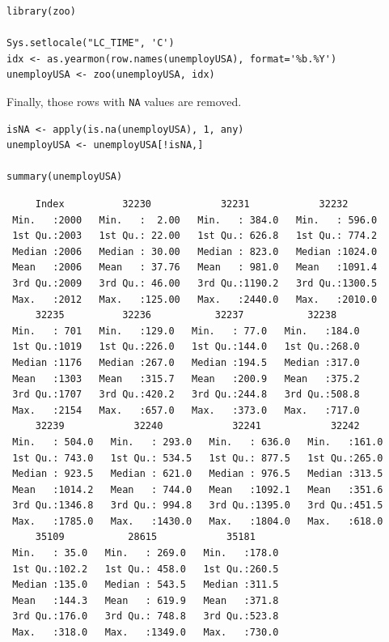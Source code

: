 \lstset{language=r,label= ,caption= ,captionpos=b,numbers=none}
\begin{lstlisting}
library(zoo)
  
Sys.setlocale("LC_TIME", 'C')
idx <- as.yearmon(row.names(unemployUSA), format='%b.%Y')
unemployUSA <- zoo(unemployUSA, idx)
\end{lstlisting}


Finally, those rows with \texttt{NA} values are removed.

\lstset{language=r,label= ,caption= ,captionpos=b,numbers=none}
\begin{lstlisting}
isNA <- apply(is.na(unemployUSA), 1, any)
unemployUSA <- unemployUSA[!isNA,]

summary(unemployUSA)
\end{lstlisting}

\begin{verbatim}
     Index          32230            32231            32232       
 Min.   :2000   Min.   :  2.00   Min.   : 384.0   Min.   : 596.0  
 1st Qu.:2003   1st Qu.: 22.00   1st Qu.: 626.8   1st Qu.: 774.2  
 Median :2006   Median : 30.00   Median : 823.0   Median :1024.0  
 Mean   :2006   Mean   : 37.76   Mean   : 981.0   Mean   :1091.4  
 3rd Qu.:2009   3rd Qu.: 46.00   3rd Qu.:1190.2   3rd Qu.:1300.5  
 Max.   :2012   Max.   :125.00   Max.   :2440.0   Max.   :2010.0  
     32235          32236           32237           32238      
 Min.   : 701   Min.   :129.0   Min.   : 77.0   Min.   :184.0  
 1st Qu.:1019   1st Qu.:226.0   1st Qu.:144.0   1st Qu.:268.0  
 Median :1176   Median :267.0   Median :194.5   Median :317.0  
 Mean   :1303   Mean   :315.7   Mean   :200.9   Mean   :375.2  
 3rd Qu.:1707   3rd Qu.:420.2   3rd Qu.:244.8   3rd Qu.:508.8  
 Max.   :2154   Max.   :657.0   Max.   :373.0   Max.   :717.0  
     32239            32240            32241            32242      
 Min.   : 504.0   Min.   : 293.0   Min.   : 636.0   Min.   :161.0  
 1st Qu.: 743.0   1st Qu.: 534.5   1st Qu.: 877.5   1st Qu.:265.0  
 Median : 923.5   Median : 621.0   Median : 976.5   Median :313.5  
 Mean   :1014.2   Mean   : 744.0   Mean   :1092.1   Mean   :351.6  
 3rd Qu.:1346.8   3rd Qu.: 994.8   3rd Qu.:1395.0   3rd Qu.:451.5  
 Max.   :1785.0   Max.   :1430.0   Max.   :1804.0   Max.   :618.0  
     35109           28615            35181      
 Min.   : 35.0   Min.   : 269.0   Min.   :178.0  
 1st Qu.:102.2   1st Qu.: 458.0   1st Qu.:260.5  
 Median :135.0   Median : 543.5   Median :311.5  
 Mean   :144.3   Mean   : 619.9   Mean   :371.8  
 3rd Qu.:176.0   3rd Qu.: 748.8   3rd Qu.:523.8  
 Max.   :318.0   Max.   :1349.0   Max.   :730.0
\end{verbatim}

